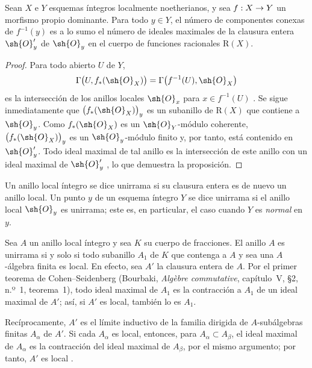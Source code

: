 \documentclass[oneside]{amsart}
\makeatletter
\newcommand{\ega@arrow}[2]{\mathchoice{#1}{#2}{#2}{#2}}
\renewcommand{\to}{\ega@arrow{\longrightarrow}{\rightarrow}}
\newcommand{\oldpage}[2][]{{\marginnote{\normalfont\textbf{#1}~|~#2}}\ignorespaces}
\let\EGAOriginalLabel\label
\renewcommand{\label}[1]{\phantomsection\EGAOriginalLabel{#1}}
\makeatother
\begin{document}
\begin{proposition}[4.3.5]
\label{III.4.3.5}
Sean $X$ e $Y$ esquemas íntegros localmente noetherianos, y sea
$f:X\to Y$ un morfismo propio dominante. Para todo $y\in Y$, el
número de componentes conexas de $f^{-1}(y)$ es a lo sumo el número
de ideales maximales de la clausura entera $\sh{O}'_y$ de
$\sh{O}_y$ en el cuerpo de funciones racionales $\mathrm{R}(X)$.
\end{proposition}

\begin{proof}
Para todo abierto $U$ de $Y$,
\[
  \Gamma\bigl(U,f_*(\sh{O}_X)\bigr)
  =
  \Gamma\bigl(f^{-1}(U),\sh{O}_X\bigr)
\]
es la intersección de los anillos locales $\sh{O}_x$ para
$x\in f^{-1}(U)$ . Se sigue inmediatamente que
$\bigl(f_*(\sh{O}_X)\bigr)_y$ es un subanillo de $\mathrm{R}(X)$ que
contiene a $\sh{O}_y$. Como $f_*(\sh{O}_X)$ es un
$\sh{O}_Y$-módulo coherente, $\bigl(f_*(\sh{O}_X)\bigr)_y$ es un
$\sh{O}_y$-módulo finito y, por tanto, está contenido en $\sh{O}'_y$.
Todo ideal maximal de tal anillo es la intersección de este anillo con
un ideal maximal de $\sh{O}'_y$
\cite[vol.~I, pp.~257 and 259]{I-13}, lo que demuestra la proposición.
\end{proof}

\begin{definition}[4.3.6]
\label{III.4.3.6}
Un anillo local íntegro se dice unirrama si su clausura entera
es de nuevo un anillo local. Un punto $y$ de un esquema íntegro
$Y$ se dice unirrama si el anillo local $\sh{O}_y$ es
unirrama; este es, en particular, el caso cuando $Y$ es \emph{normal} en
$y$.
\end{definition}

Sea $A$ un anillo local íntegro y sea $K$ su cuerpo de fracciones. El
anillo $A$ es unirrama si y solo si todo subanillo $A_1$ de $K$ que
contenga a $A$ y sea una $A$-álgebra finita es local. En efecto, sea
$A'$ la clausura entera de $A$. Por el primer teorema de
Cohen--Seidenberg (Bourbaki, \emph{Alg\`ebre commutative}, capítulo~V,
\S2, n.º~1, teorema~1), todo ideal maximal de $A_1$ es la contracción
a $A_1$ de un ideal maximal de $A'$; así, si $A'$ es local, también
lo es $A_1$.

\oldpage[III]{133}

Recíprocamente, $A'$ es el límite inductivo de la familia dirigida de
$A$-subálgebras finitas $A_\alpha$ de $A'$. Si cada $A_\alpha$ es
local, entonces, para $A_\alpha\subset A_\beta$, el ideal maximal de
$A_\alpha$ es la contracción del ideal maximal de $A_\beta$, por el
mismo argumento; por tanto, $A'$ es local
.
\end{document}
